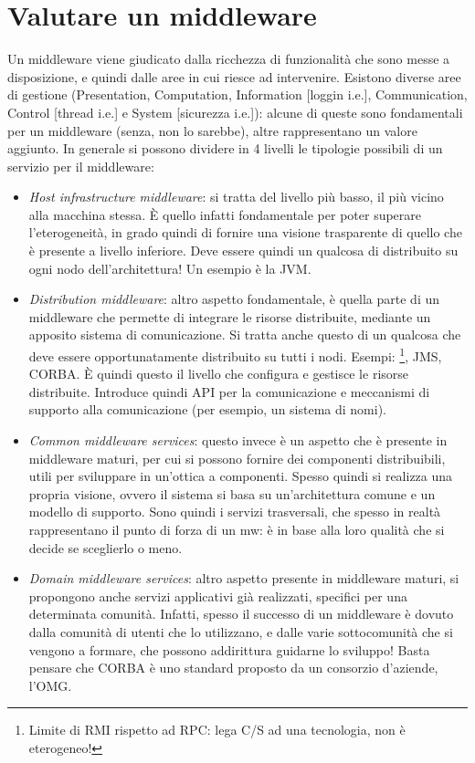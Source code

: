 \section{Valutare un middleware}
Un middleware viene giudicato dalla ricchezza di funzionalità che sono messe a disposizione, e quindi dalle aree in
cui riesce ad intervenire. Esistono diverse aree di gestione (Presentation, Computation, Information [loggin i.e.],
Communication, Control [thread i.e.] e System [sicurezza i.e.]): alcune di queste sono fondamentali per un middleware
(senza, non lo sarebbe), altre rappresentano un valore aggiunto.
In generale si possono dividere in 4 livelli le tipologie possibili di un servizio per il middleware:
\begin{itemize}
 \item \textit{Host infrastructure middleware}: si tratta del livello più basso, il più vicino alla macchina stessa.
 È quello infatti fondamentale per poter superare l'eterogeneità, in grado quindi di fornire una visione trasparente
 di quello che è presente a livello inferiore. Deve essere quindi un qualcosa di distribuito su ogni nodo
 dell'architettura! Un esempio è la JVM.
 \item \textit{Distribution middleware}: altro aspetto fondamentale, è quella parte di un middleware che permette di
 integrare le risorse distribuite, mediante un apposito sistema di comunicazione. Si tratta anche questo di un
 qualcosa che deve essere opportunatamente distribuito su tutti i nodi. Esempi: \footnote{Limite di RMI rispetto
 ad RPC: lega C/S ad una tecnologia, non è eterogeneo!}, JMS, CORBA. È quindi questo il livello che configura e
 gestisce le risorse distribuite. Introduce quindi API per la comunicazione e meccanismi  di supporto alla
 comunicazione (per esempio, un sistema di nomi).
 \item \textit{Common middleware services}: questo invece è un aspetto che è presente in middleware maturi, per cui si
 possono fornire dei componenti distribuibili, utili per sviluppare in un'ottica a componenti. Spesso quindi si realizza
 una propria visione, ovvero il sistema si basa su un'architettura comune e un modello di supporto. Sono quindi i
 servizi trasversali, che spesso in realtà rappresentano il punto di forza di un mw: è in base alla loro qualità
 che si decide se sceglierlo o meno.
 \item \textit{Domain middleware services}: altro aspetto presente in middleware maturi, si propongono anche servizi
 applicativi già realizzati, specifici per una determinata comunità. Infatti, spesso il successo di un middleware è
 dovuto dalla comunità di utenti che lo utilizzano, e dalle varie sottocomunità che si vengono a formare, che possono
 addirittura guidarne lo sviluppo! Basta pensare che CORBA è uno standard proposto da un consorzio d'aziende, l'OMG.
\end{itemize}

